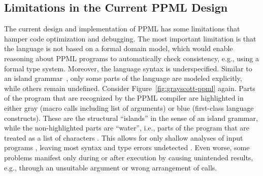 \subsection{Limitations in the Current PPML Design}
The current design and implementation of PPML has some limitations that hamper code optimization and debugging. The most important limitation is that the language is
not based on a formal domain model, which would enable reasoning about PPML programs to automatically check consistency, e.g., using a formal type system. Moreover,
the language syntax is underspecified. Similar to an island grammar~\cite{moonen_generating_2001}, only some parts of the language are modeled explicitly,  while others remain undefined.
%
Consider Figure~\ref{fig:grayscott-ppml} again. Parts of the program that are recognized by the PPML  compiler are highlighted in either gray (macro calls including list of arguments)
or blue (first-class language constructs). These are the structural ``islands'' in the sense of an island grammar, while the non-highlighted parts are ``water'', i.e., parts of the program that are treated as a list of
characters .  
%
This  allows for only shallow analyses of input programs , leaving most syntax and type errors undetected . 
%
Even worse, some problems manifest only during or after execution by causing unintended
results, e.g., through an unsuitable argument or wrong arrangement of calls.

